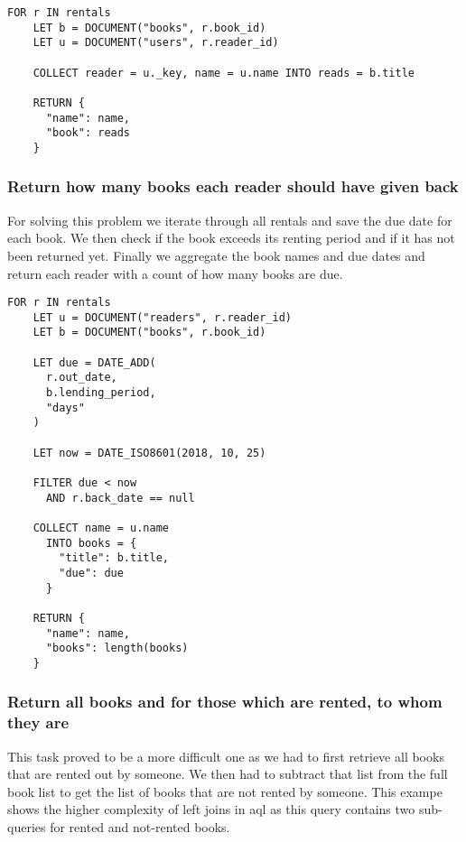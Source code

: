 \begin{lstlisting}[language=ArangoQL,label={lst:graph},caption={Return which book is rented by whom}]
  FOR r IN rentals
    LET b = DOCUMENT("books", r.book_id)
    LET u = DOCUMENT("users", r.reader_id)
    
    COLLECT reader = u._key, name = u.name INTO reads = b.title

    RETURN {
      "name": name,
      "book": reads
    }
\end{lstlisting}

\subsubsection{Return how many books each reader should have given back}

For solving this problem we iterate through all rentals and save the due date for each book. We then check if the book exceeds its renting period and if it has not been returned yet. Finally we aggregate the book names and due dates and return each reader with a count of how many books are due.

\begin{lstlisting}[language=ArangoQL,label={lst:graph},caption={Return how many books each reader should have given back}]
  FOR r IN rentals
    LET u = DOCUMENT("readers", r.reader_id)
    LET b = DOCUMENT("books", r.book_id)

    LET due = DATE_ADD(
      r.out_date,
      b.lending_period,
      "days"
    )

    LET now = DATE_ISO8601(2018, 10, 25)
    
    FILTER due < now
      AND r.back_date == null
    
    COLLECT name = u.name
      INTO books = {
        "title": b.title,
        "due": due
      }

    RETURN {
      "name": name,
      "books": length(books)
    }
\end{lstlisting}

\subsubsection{Return all books and for those which are rented, to whom they are}

This task proved to be a more difficult one as we had to first retrieve all books that are rented out by someone. We then had to subtract that list from the full book list to get the list of books that are not rented by someone. This exampe shows the higher complexity of left joins in \gls{aql} as this query contains two sub-queries for rented and not-rented books.


